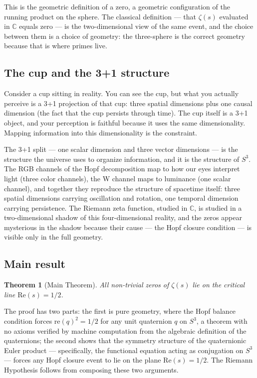 \documentclass[12pt,a4paper]{article}
\newtheorem{theorem}{Theorem}[section]
\theoremstyle{definition}
\theoremstyle{remark}
\begin{document}
This is the geometric definition of a zero, a geometric
configuration of the running product on the sphere. The classical definition
--- that $\zeta(s)$ evaluated in $\mathbb{C}$ equals zero --- is the
two-dimensional view of the same event, and the choice between them is a
choice of geometry: the three-sphere is the correct geometry because that is
where primes live.

\subsection{The cup and the 3+1 structure}

Consider a cup sitting in reality. You can see the cup, but what you actually
perceive is a 3+1 projection of that cup: three spatial dimensions plus one
causal dimension (the fact that the cup persists through time). The cup itself
is a 3+1 object, and your perception is faithful because it uses the same
dimensionality. Mapping information into this dimensionality is the constraint.

The 3+1 split --- one scalar dimension and three vector dimensions --- is the
structure the universe uses to organize information, and it is the structure of
$S^3$. The RGB channels of the Hopf decomposition map to how our eyes interpret
light (three color channels), the W channel maps to luminance (one scalar
channel), and together they reproduce the structure of spacetime itself: three
spatial dimensions carrying oscillation and rotation, one temporal dimension
carrying persistence. The Riemann zeta function, studied in $\mathbb{C}$, is
studied in a two-dimensional shadow of this four-dimensional reality, and the
zeros appear mysterious in the shadow because their cause --- the Hopf closure
condition --- is visible only in the full geometry.

\subsection{Main result}

\begin{theorem}[Main Theorem]\label{thm:main}
All non-trivial zeros of $\zeta(s)$ lie on the critical line $\mathrm{Re}(s) = 1/2$.
\end{theorem}

The proof has two parts: the first is pure geometry, where the Hopf balance
condition forces $\mathrm{re}(q)^2 = 1/2$ for any unit quaternion $q$ on $S^3$,
a theorem with no axioms verified by machine computation from the algebraic
definition of the quaternions; the second shows that the symmetry structure of
the quaternionic Euler product --- specifically, the functional equation acting
as conjugation on $S^3$ --- forces any Hopf closure event to lie on the plane
$\mathrm{Re}(s) = 1/2$. The Riemann Hypothesis follows from composing these
two arguments.
\end{document}
